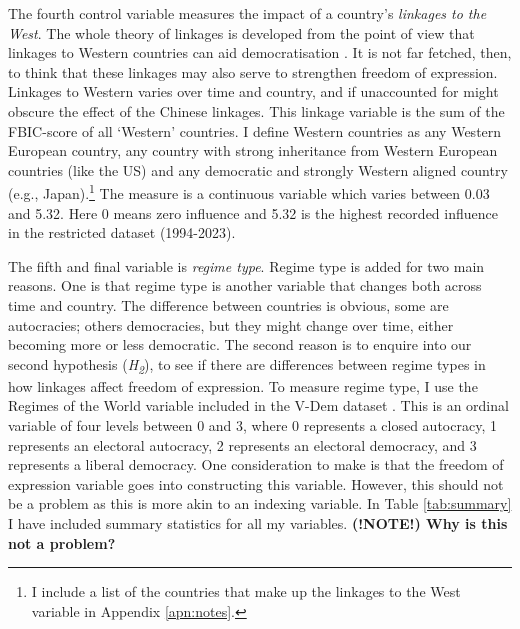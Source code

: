 The fourth control variable measures the impact of a country's \textit{linkages to the West}. The whole theory of linkages is developed from the point of view that linkages to Western countries can aid democratisation \citep{levitsky_linkage_2006}. It is not far fetched, then, to think that these linkages may also serve to strengthen freedom of expression. Linkages to Western varies over time and country, and if unaccounted for might obscure the effect of the Chinese linkages. This linkage variable is the sum of the FBIC-score of all `Western' countries. I define Western countries as any Western European country, any country with strong inheritance from Western European countries (like the US) and any democratic and strongly Western aligned country (e.g., Japan).\footnote{I include a list of the countries that make up the linkages to the West variable in Appendix \ref{apn:notes}.} The measure is a continuous variable which varies between 0.03 and 5.32. Here 0 means zero influence and 5.32 is the highest recorded influence in the restricted dataset (1994-2023). 

The fifth and final variable is \textit{regime type}. Regime type is added for two main reasons. One is that regime type is another variable that changes both across time and country. The difference between countries is obvious, some are autocracies; others democracies, but they might change over time, either becoming more or less democratic. The second reason is to enquire into our second hypothesis (\textit{H\textsubscript{2}}), to see if there are differences between regime types in how linkages affect freedom of expression. To measure regime type, I use the Regimes of the World variable included in the V-Dem dataset \citep{coppedge_v-dem_2025}. This is an ordinal variable of four levels between 0 and 3, where 0 represents a closed autocracy, 1 represents an electoral autocracy, 2 represents an electoral democracy, and 3 represents a liberal democracy. One consideration to make is that the freedom of expression variable goes into constructing this variable. However, this should not be a problem as this is more akin to an indexing variable. In Table \ref{tab:summary} I have included summary statistics for all my variables. \textbf{(!NOTE!) Why is this not a problem?}

